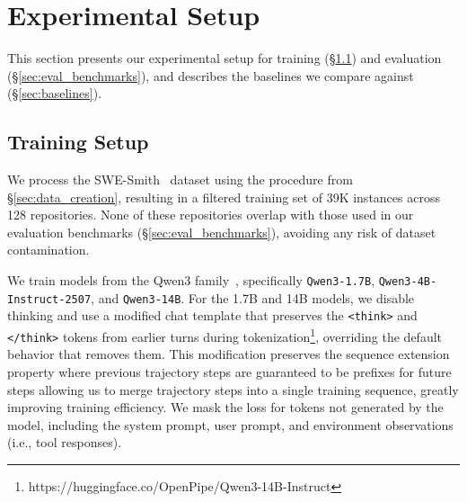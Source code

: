 
\section{Experimental Setup}
\label{sec:experiments}

This section presents our experimental setup for training (\S\ref{sec:train_setup}) and evaluation (\S\ref{sec:eval_benchmarks}), and describes the baselines we compare \methodname against (\S\ref{sec:baselines}).

\subsection{Training Setup}\label{sec:train_setup}
We process the SWE-Smith~\citep{yang2025swesmithscalingdatasoftware} dataset using the procedure from \S\ref{sec:data_creation}, resulting in a filtered training set of 39K instances across 128 repositories. None of these repositories overlap with those used in our evaluation benchmarks (\S\ref{sec:eval_benchmarks}), avoiding any risk of dataset contamination.

We train models from the Qwen3 family~\citep{yang2025qwen3technicalreport}, specifically \texttt{Qwen3-1.7B}, \texttt{Qwen3-4B-Instruct-2507}, and \texttt{Qwen3-14B}. For the 1.7B and 14B models, we disable thinking and use a modified chat template that preserves the \texttt{<think>} and \texttt{</think>} tokens from earlier turns during tokenization\footnote{https://huggingface.co/OpenPipe/Qwen3-14B-Instruct}, overriding the default behavior that removes them. This modification preserves the sequence extension property where previous trajectory steps are guaranteed to be prefixes for future steps allowing us to merge trajectory steps into a single training sequence, greatly improving training efficiency. We mask the loss for tokens not generated by the model, including the system prompt, user prompt, and environment observations (i.e., tool responses). 

